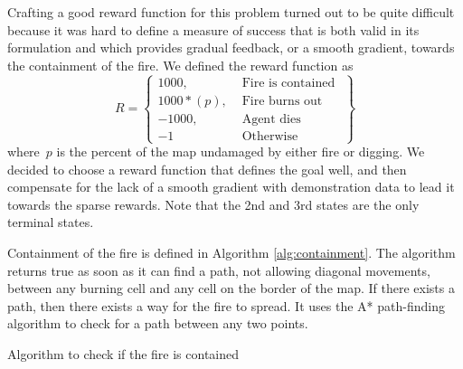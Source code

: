 Crafting a good reward function for this problem turned out to be quite difficult because it was hard to define a measure of success that is both valid in its formulation and which provides gradual feedback, or a smooth gradient, towards the containment of the fire. We defined the reward function as
\[
R = \left\{\begin{array}{lr}
    1000, & \text{ Fire is contained }\\
    1000 * (p), & \text{ Fire burns out }\\
    -1000, & \text{ Agent dies }\\
    -1 & \text{ Otherwise }

    \end{array}\right\}
\]
where~$p$ is the percent of the map undamaged by either fire or digging. We decided to choose a reward function that defines the goal well, and then compensate for the lack of a smooth gradient with demonstration data to lead it towards the sparse rewards. Note that the 2nd and 3rd states are the only terminal states.

Containment of the fire is defined in Algorithm \ref{alg:containment}. The algorithm returns true as soon as it can find a path, not allowing diagonal movements, between any burning cell and any cell on the border of the map. If there exists a path, then there exists a way for the fire to spread. It uses the A* path-finding algorithm to check for a path between any two points.

\begin{algorithm}
  \caption{Algorithm to check if the fire is contained}
  \label{alg:containment}
  \begin{algorithmic}[1]
    \State {}
    \Else
    \EndIf
    \Else
    \EndIf
    \EndWhile
    \State {}
    \EndProcedure
  \end{algorithmic}
\end{algorithm}




